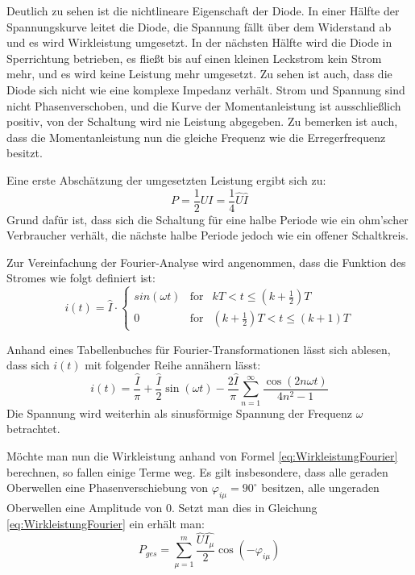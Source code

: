Deutlich zu sehen ist die nichtlineare Eigenschaft der Diode. In einer Hälfte der Spannungskurve leitet die Diode, die Spannung fällt über dem Widerstand ab und es wird Wirkleistung umgesetzt. In der nächsten Hälfte wird die Diode in Sperrichtung betrieben, es fließt bis auf einen kleinen Leckstrom kein Strom mehr, und es wird keine Leistung mehr umgesetzt.
Zu sehen ist auch, dass die Diode sich nicht wie eine komplexe Impedanz verhält. Strom und Spannung sind nicht Phasenverschoben, und die Kurve der Momentanleistung ist ausschließlich positiv, von der Schaltung wird nie Leistung abgegeben. Zu bemerken ist auch, dass die Momentanleistung nun die gleiche Frequenz wie die Erregerfrequenz besitzt.

Eine erste Abschätzung der umgesetzten Leistung ergibt sich zu:
\begin{equation*}
P = \frac{1}{2} UI = \frac{1}{4}\hat{U}\hat{I}
\end{equation*}
Grund dafür ist, dass sich die Schaltung für eine halbe Periode wie ein ohm'scher Verbraucher verhält, die nächste halbe Periode jedoch wie ein offener Schaltkreis.

Zur Vereinfachung der Fourier-Analyse wird angenommen, dass die Funktion des Stromes wie folgt definiert ist:
\begin{equation}
i(t)=\hat{I}\cdot \left\{ 
\begin{array}{ccr}
	sin(\omega t) & \mbox{for} & kT < t \leq (k+\frac{1}{2})T \\
	0 & \mbox{for} & (k+\frac{1}{2})T < t \leq (k+1)T
\end{array}
\right.
\end{equation}
\cite{calpolyFourier}

Anhand eines Tabellenbuches für Fourier-Transformationen lässt sich ablesen, dass sich $i(t)$ mit folgender Reihe annähern lässt:
\begin{equation}
i(t) = \frac{\hat{I}}{\pi} + \frac{\hat{I}}{2}\sin(\omega t) - \frac{2\hat{I}}{\pi}\sum_{n=1}^{\infty}\frac{\cos(2n\omega t)}{4n^2 - 1}
\end{equation}
Die Spannung wird weiterhin als sinusförmige Spannung der Frequenz $\omega$ betrachtet.

Möchte man nun die Wirkleistung anhand von Formel \eqref{eq:WirkleistungFourier} berechnen, so fallen einige Terme weg. Es gilt insbesondere, dass alle geraden Oberwellen eine Phasenverschiebung von $\varphi_{i\mu} = 90^\circ$ besitzen, alle ungeraden Oberwellen eine Amplitude von 0. Setzt man dies in Gleichung \eqref{eq:WirkleistungFourier} ein erhält man:
\begin{equation*}
P_{ges} = \sum_{\mu=1}^m\frac{\hat{U}\hat{I_\mu}}{2}\cos(-\varphi_{i\mu})
\end{equation*}

